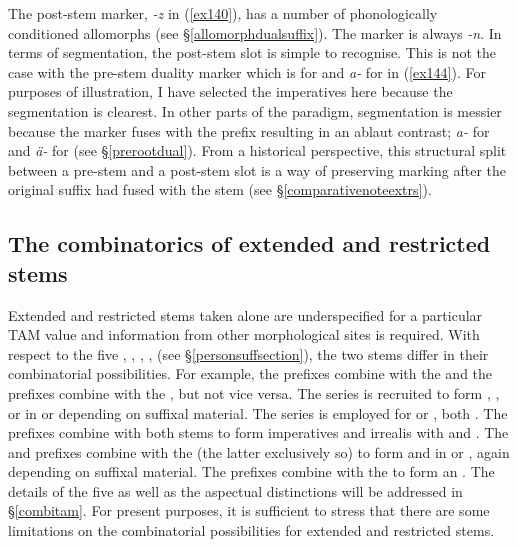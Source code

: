 The post-stem  marker, \emph{-z} in (\ref{ex140}), has a number of phonologically conditioned allomorphs (see \S{}\ref{allomorphdualsuffix}). The  marker is always \emph{-n}. In terms of segmentation, the post-stem slot is simple to recognise. This is not the case with the pre-stem duality marker which is  for  and \emph{a-} for  in (\ref{ex144}). For purposes of illustration, I have selected the imperatives here because the segmentation is clearest. In other parts of the paradigm, segmentation is messier because the  marker fuses with the  prefix resulting in an ablaut contrast; \emph{a-} for  and \emph{ä-} for  (see \S{}\ref{prerootdual}). From a historical perspective, this structural split between a pre-stem and a post-stem slot is a way of preserving  marking after the original suffix had fused with the stem (see \S{}\ref{comparativenoteextrs}).

\subsection{The combinatorics of extended and restricted stems} \label{combinatoricsextrs}

Extended and restricted stems taken alone are underspecified for a particular TAM value and information from other morphological sites is required. With respect to the five  \Alph, \Bet{}, \Betaone{}, \Betatwo, \Gam{} (see \S{}\ref{personsuffsection}), the two stems differ in their combinatorial possibilities. For example, the \Alph{} prefixes combine with the  and the \Gam{} prefixes combine with the , but not vice versa. The \Alph{} series is recruited to form , ,  or  in  or   depending on suffixal material. The \Gam{} series is employed for  or , both . The \Bet{} prefixes combine with both stems to form imperatives and irrealis with  and  . The \Betaone{} and \Betatwo{} prefixes combine with the  (the latter exclusively so) to form  and  in  or  , again depending on suffixal material. The \Betaone{} prefixes combine with the  to form an . The details of the five  as well as the aspectual distinctions will be addressed in \S{}\ref{combitam}. For present purposes, it is sufficient to stress that there are some limitations on the combinatorial possibilities for extended and restricted stems.

